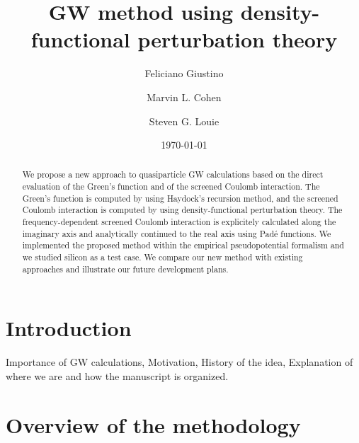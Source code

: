 \documentclass[twocolumn,prb,showpacs,superscriptaddress]{revtex4}
\begin{document}
\title{GW method using density-functional perturbation theory}

\author{Feliciano Giustino}
\author{Marvin L. Cohen}
\author{Steven G. Louie}
\date{\today}

\begin{abstract}
We propose a new approach to quasiparticle GW calculations based on the
direct evaluation of the Green's function and of the screened Coulomb interaction.
The Green's function is computed by using Haydock's recursion method,
and the screened Coulomb interaction is computed by using density-functional
perturbation theory. The frequency-dependent screened Coulomb interaction 
is explicitely calculated along the imaginary axis and analytically continued 
to the real axis using Pad\'e functions. We implemented the
proposed method within the empirical pseudopotential formalism and 
we studied silicon as a test case. We compare our new method with existing
approaches and illustrate our future development plans.
\end{abstract}


\maketitle

\section{Introduction}

Importance of GW calculations, Motivation, History of the idea,
Explanation of where we are and how the manuscript is organized.

\section{Overview of the methodology}
\end{document}
